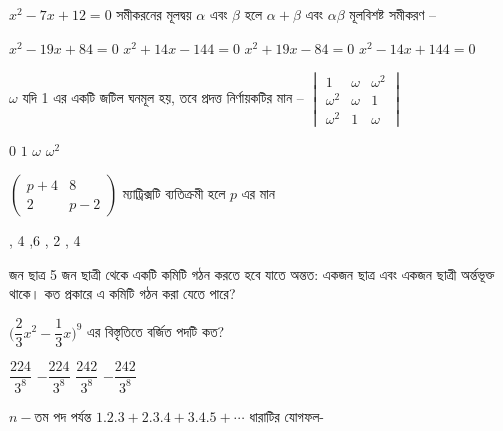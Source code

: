 \documentclass[addpoints]{exam}
\begin{document}
\begin{questions}

\question $ x^{2}-7x+12=0 $  সমীকরনের মূলদ্বয় $       \alpha $ এবং $ \beta $ হলে $ \alpha
+\beta $ এবং $ \alpha\beta $ মূলবিশষ্ট সমীকরণ –

\begin{oneparchoices}
\choice $ x^{2}-19x+84=0 $
\choice $ x^{2}+14x-144=0 $
\choice $ x^{2}+19x-84=0 $
\choice $ x^{2}-14x+144=0 $
\end{oneparchoices}

\question $ \omega $ যদি 1 এর একটি জটিল ঘনমূল হয়, তবে প্রদত্ত নির্ণায়কটির মান – $ \begin{vmatrix}
1 & \omega & \omega^{2} \\
\omega^{2} & \omega & 1\\
\omega^{2} & 1 & \omega
\end{vmatrix} $  

\begin{oneparchoices}
\choice $ 0 $
\choice $ 1 $
\choice $ \omega $
\choice $ \omega^{2} $
\end{oneparchoices}

\question  $\begin{pmatrix}
p+4 & 8 \\
2 & p-2
\end{pmatrix} $ ম্যাট্রিক্সটি ব্যতিক্রমী হলে $ p $ এর মান

\begin{oneparchoices}
, 4
,6
, 2
, 4
\end{oneparchoices}

 জন ছাত্র 5 জন ছাত্রী থেকে একটি কমিটি গঠন করতে হবে যাতে অন্তত: একজন ছাত্র এবং একজন ছাত্রী অর্ন্তভূক্ত থাকে। কত প্রকারে এ কমিটি গঠন করা যেতে পারে?

\begin{oneparchoices}
\end{oneparchoices}

\question $ \Big(\dfrac{2}{3} x^{2}-\dfrac{1}{3}x\Big)^{9} $ এর বিস্তৃতিতে বর্জিত পদটি কত?

\begin{oneparchoices}
\choice $ \dfrac{224}{3^{8}} $
\choice $ -\dfrac{224}{3^{8}} $
\choice $ \dfrac{242}{3^{8}} $
\choice $ -\dfrac{242}{3^{8}} $

\end{oneparchoices}

\question  $ n- $তম পদ পর্যন্ত $ 1.2.3+2.3.4+3.4.5+\cdots $ ধারাটির যোগফল-


\end{questions}
\end{document}
